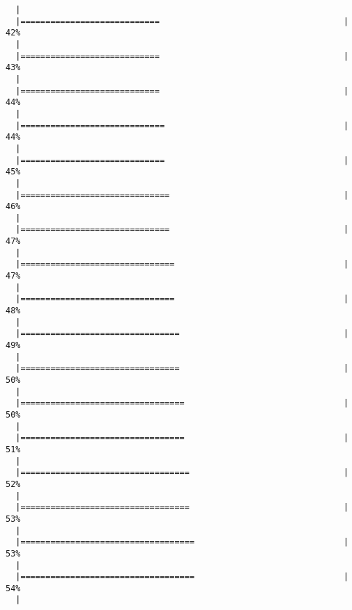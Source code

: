 \begin{knitrout}
\begin{kframe}
\begin{verbatim}
  |                                                                       
  |============================                                     |  42%
  |                                                                       
  |============================                                     |  43%
  |                                                                       
  |============================                                     |  44%
  |                                                                       
  |=============================                                    |  44%
  |                                                                       
  |=============================                                    |  45%
  |                                                                       
  |==============================                                   |  46%
  |                                                                       
  |==============================                                   |  47%
  |                                                                       
  |===============================                                  |  47%
  |                                                                       
  |===============================                                  |  48%
  |                                                                       
  |================================                                 |  49%
  |                                                                       
  |================================                                 |  50%
  |                                                                       
  |=================================                                |  50%
  |                                                                       
  |=================================                                |  51%
  |                                                                       
  |==================================                               |  52%
  |                                                                       
  |==================================                               |  53%
  |                                                                       
  |===================================                              |  53%
  |                                                                       
  |===================================                              |  54%
  |                                                                       

\end{verbatim}
\end{kframe}
\end{knitrout}

